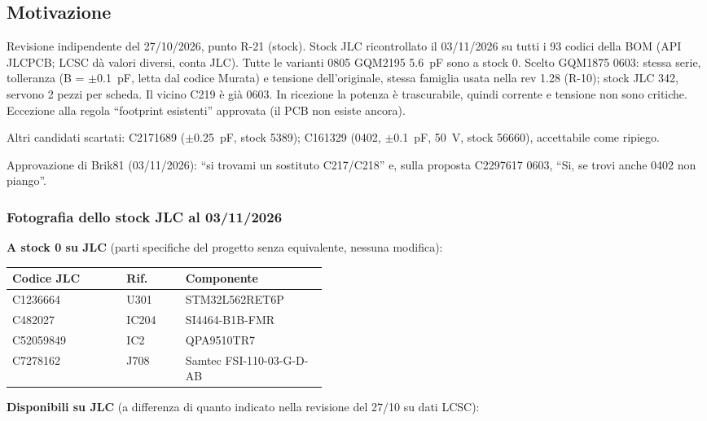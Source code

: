 \subsection{Motivazione}
Revisione indipendente del 27/10/2026, punto R-21 (stock). Stock JLC ricontrollato il 03/11/2026 su tutti i 93 codici della BOM (API JLCPCB; LCSC dà valori diversi, conta JLC). Tutte le varianti 0805 GQM2195 \SI{5,6}{\pico\farad} sono a stock 0. Scelto GQM1875 0603: stessa serie, tolleranza (B = $\pm$\SI{0,1}{\pico\farad}, letta dal codice Murata) e tensione dell'originale, stessa famiglia usata nella rev 1.28 (R-10); stock JLC 342, servono 2 pezzi per scheda. Il vicino C219 è già 0603. In ricezione la potenza è trascurabile, quindi corrente e tensione non sono critiche. Eccezione alla regola \textquotedblleft{}footprint esistenti\textquotedblright{} approvata (il PCB non esiste ancora).

Altri candidati scartati:  C2171689 ($\pm$\SI{0,25}{\pico\farad}, stock 5389);  C161329 (0402, $\pm$\SI{0,1}{\pico\farad}, \SI{50}{\volt}, stock 56660), accettabile come ripiego.

Approvazione di Brik81 (03/11/2026): \textquotedblleft{}si trovami un sostituto C217/C218\textquotedblright{} e, sulla proposta C2297617 0603, \textquotedblleft{}Si, se trovi anche 0402 non piango\textquotedblright{}.

\subsubsection*{Fotografia dello stock JLC al 03/11/2026}
\textbf{A stock 0 su JLC} (parti specifiche del progetto senza equivalente, nessuna modifica):

{\small{}
\begin{tabular}{@{}ll>{\raggedright\arraybackslash}p{0.45\linewidth}@{}}
\toprule
\textbf{Codice JLC} & \textbf{Rif.} & \textbf{Componente}\\
\midrule
C1236664 & U301 & STM32L562RET6P\\
C482027 & IC204 & SI4464-B1B-FMR\\
C52059849 & IC2 & QPA9510TR7\\
C7278162 & J708 & Samtec FSI-110-03-G-D-AB\\
\bottomrule
\end{tabular}}

\medskip
\textbf{Disponibili su JLC} (a differenza di quanto indicato nella revisione del 27/10 su dati LCSC):


